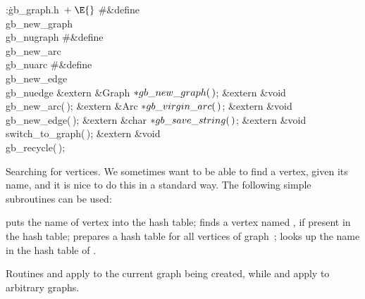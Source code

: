 \B{}:\.{gb\_graph.h\,}\X${}\mathrel+\E{}$\6
\8\#\&{define} \\{gb\_new\_graph}\5\\{gb\_nugraph}\6
\8\#\&{define} \\{gb\_new\_arc}\5\\{gb\_nuarc}\6
\8\#\&{define} \\{gb\_new\_edge}\5\\{gb\_nuedge}\6
\&{extern} \&{Graph} ${}{*}\\{gb\_new\_graph}(\,){}$;\6
\&{extern} \&{void} \\{gb\_new\_arc}(\,);\6
\&{extern} \&{Arc} ${}{*}\\{gb\_virgin\_arc}(\,){}$;\6
\&{extern} \&{void} \\{gb\_new\_edge}(\,);\6
\&{extern} \&{char} ${}{*}\\{gb\_save\_string}(\,){}$;\6
\&{extern} \&{void} \\{switch\_to\_graph}(\,);\6
\&{extern} \&{void} \\{gb\_recycle}(\,);\par
\fi

Searching for vertices. We sometimes want to be able to find a vertex,
given
its name, and it is nice to do this in a standard way. The following simple
subroutines can be used:

{\narrower
\smallskip{} puts the name of vertex  into the hash
table;
\smallskip{} finds a vertex named , if present in
the hash table;
\smallskip{} prepares a hash table for all vertices of
graph~;
\smallskip{} looks up the name  in the
hash table of .
\smallskip}

\noindent Routines  and  apply to the
current graph being
created, while  and  apply to
arbitrary graphs.


